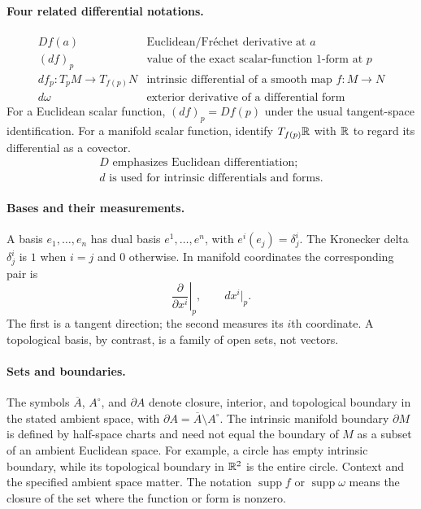 \paragraph{Four related differential notations.}
\[
\begin{array}{c|l}
Df(a)&\text{Euclidean/Fr\'echet derivative at }a\\
(df)_p&\text{value of the exact scalar-function $1$-form at }p\\
df_p:T_pM\to T_{f(p)}N&\text{intrinsic differential of a smooth map }f:M\to N\\
d\omega&\text{exterior derivative of a differential form}
\end{array}
\]
For a Euclidean scalar function, $(df)_p=Df(p)$ under the usual
tangent-space identification. For a manifold scalar function, identify
$T_{f(p)}\mathbb{R}$ with $\mathbb{R}$ to regard its differential as a covector.
\[
\boxed{\begin{gathered}
D\text{ emphasizes Euclidean differentiation;}\\
d\text{ is used for intrinsic differentials and forms.}
\end{gathered}}
\]
\paragraph{Bases and their measurements.}
A basis $e_1,\ldots,e_n$ has dual basis $e^1,\ldots,e^n$, with
$e^i(e_j)=\delta^i_j$. The Kronecker delta $\delta^i_j$ is $1$ when
$i=j$ and $0$ otherwise. In manifold coordinates the corresponding pair is
\[
\left.\frac{\partial}{\partial x^i}\right|_p,
\qquad dx^i|_p.
\]
The first is a tangent direction; the second measures its $i$th coordinate.
A topological basis, by contrast, is a family of open sets, not vectors.

\paragraph{Sets and boundaries.}
The symbols $\overline A$, $A^\circ$, and $\partial A$ denote closure,
interior, and topological boundary in the stated ambient space, with
$\partial A=\overline A\setminus A^\circ$. The intrinsic manifold boundary
$\partial M$ is defined by half-space charts and need not equal the
boundary of $M$ as a subset of an ambient Euclidean space. For example,
a circle has empty intrinsic boundary, while its topological boundary in
$\mathbb{R}^2$ is the entire circle. Context and the specified ambient space
matter. The notation $\operatorname{supp}f$ or $\operatorname{supp}\omega$
means the closure of the set where the function or form is nonzero.
\par
\endgroup
